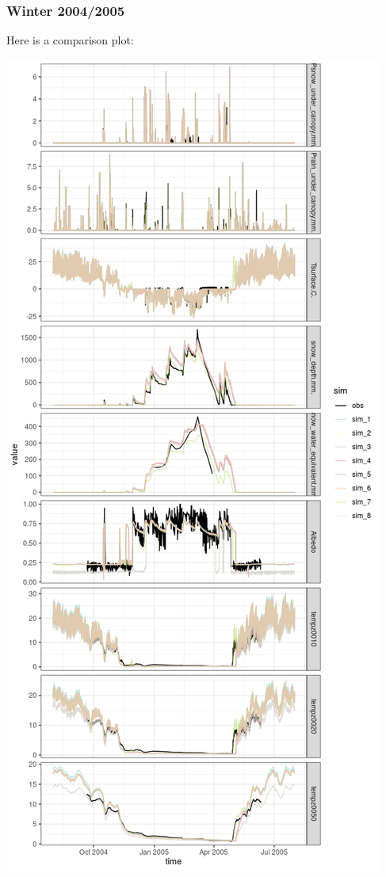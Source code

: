 \documentclass[
]{article}
\begin{document}
\hypertarget{winter-20042005}{%
\subsubsection{Winter 2004/2005}\label{winter-20042005}}

Here is a comparison plot:

\includegraphics{coldelaporte_v6_files/figure-latex/Winter_2004_2005-1.png}
\end{document}
